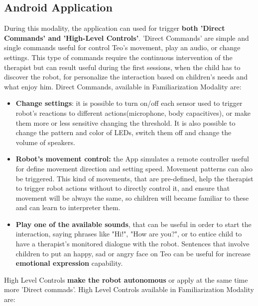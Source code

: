 \subsection{Android Application}
During this modality, the application can used for trigger \textbf{both 'Direct Commands' and 'High-Level Controls'}. 'Direct Commands' are simple and single commands useful for control Teo's movement, play an audio, or change settings. This type of commands require the continuous intervention of the therapist but can result useful during the first sessions, when the child has to discover the robot, for personalize the interaction based on children's needs and what enjoy him. Direct Commands, available in Familiarization Modality are:
\begin{itemize}	
	\item \textbf{Change settings}: it is possible to turn on/off each sensor used to trigger robot's reactions to different actions(microphone, body capacitives), or make them more or less sensitive changing the threshold. It is also possible to change the pattern and color of  LEDs, switch them off and change the volume of speakers.
	
	
	\item \textbf{Robot's movement control:} the App simulates a remote controller useful for define movement direction and setting speed. Movement patterns can also be triggered. This kind of movements, that are pre-defined, help the therapist to trigger robot actions without to directly control it, and ensure that movement will be always the same, so children will became familiar to these and can learn to interpreter them.  
	
	\item \textbf{Play one of the available sounds}, that can be useful in order to start the interaction, saying phrases like "Hi!", "How are you?", or to entice child to have a therapist's monitored dialogue with the robot. Sentences that involve children to put an happy, sad or angry face on Teo can be useful for increase \textbf{emotional expression} capability.
	
\end{itemize}
High Level Controls \textbf{make the robot autonomous} or apply at the same time more 'Direct commads'. High Level Controls available in Familiarization Modality are:
